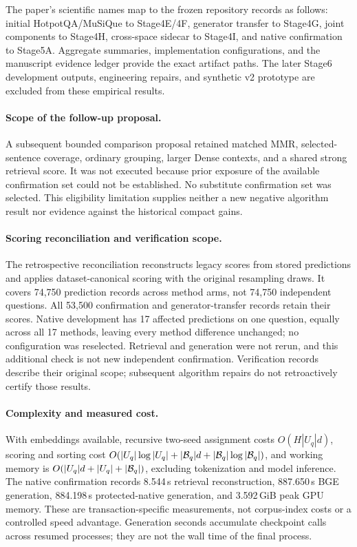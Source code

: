 \documentclass[11pt]{article}
\begin{document}
The paper's scientific names map to the frozen repository records as follows:
initial HotpotQA/MuSiQue to Stage4E/4F, generator transfer to Stage4G,
joint components to Stage4H, cross-space sidecar to Stage4I, and native
confirmation to Stage5A. Aggregate summaries, implementation configurations,
and the manuscript evidence ledger provide the exact artifact paths.
The later Stage6 development outputs, engineering repairs, and synthetic v2
prototype are excluded from these empirical results.

\paragraph{Scope of the follow-up proposal.}
A subsequent bounded comparison proposal retained matched MMR, selected-sentence
coverage, ordinary grouping, larger Dense contexts, and a shared strong
retrieval score. It was not executed because prior exposure of the available
confirmation set could not be established. No substitute confirmation set
was selected. This eligibility limitation supplies neither a new negative
algorithm result nor evidence against the historical compact gains.

\paragraph{Scoring reconciliation and verification scope.}
\label{app:scoring}
The retrospective reconciliation reconstructs legacy scores from stored
predictions and applies dataset-canonical scoring with the original
resampling draws. It covers 74,750 prediction records across method arms,
not 74,750 independent questions. All 53,500 confirmation and
generator-transfer records retain their scores. Native development has 17
affected predictions on one question, equally across all 17 methods, leaving
every method difference unchanged; no configuration was reselected.
Retrieval and generation were not rerun, and this additional check is not
new independent confirmation. Verification records describe their original
scope; subsequent algorithm repairs do not retroactively certify those results.

\paragraph{Complexity and measured cost.}
With embeddings available, recursive two-seed assignment costs
$O(H|U_q|d)$, scoring and sorting cost
$O(|U_q|\log|U_q|+|{\cal B}_q|d+|{\cal B}_q|\log|{\cal B}_q|)$,
and working memory is $O(|U_q|d+|U_q|+|{\cal B}_q|)$, excluding tokenization
and model inference. The native confirmation records 8.544\,s retrieval
reconstruction, 887.650\,s BGE generation, 884.198\,s protected-native
generation, and 3.592\,GiB peak GPU memory. These are transaction-specific
measurements, not corpus-index costs or a controlled speed advantage.
Generation seconds accumulate checkpoint calls across resumed processes;
they are not the wall time of the final process.
\end{document}
